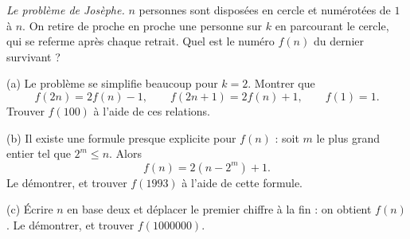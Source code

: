 \emph{Le problème de Josèphe.} $n$ personnes sont disposées en cercle et numérotées de $1$ à $n$. On retire de proche en proche une personne sur $k$ en parcourant le cercle, qui se referme après chaque retrait. Quel est le numéro $f(n)$ du dernier survivant ?

(a) Le problème se simplifie beaucoup pour $k = 2$. Montrer que
\[ f(2n) = 2f(n) - 1,\qquad f(2n+1) = 2f(n) + 1,\qquad f(1) = 1. \]
Trouver $f(100)$ à l'aide de ces relations.

(b) Il existe une formule presque explicite pour $f(n)$ : soit $m$ le plus grand entier tel que $2^m \leq n$. Alors
\[ f(n) = 2(n - 2^m) + 1. \]
Le démontrer, et trouver $f(1993)$ à l'aide de cette formule.

(c) Écrire $n$ en base deux et déplacer le premier chiffre à la fin : on obtient $f(n)$. Le démontrer, et trouver $f(1000000)$.
